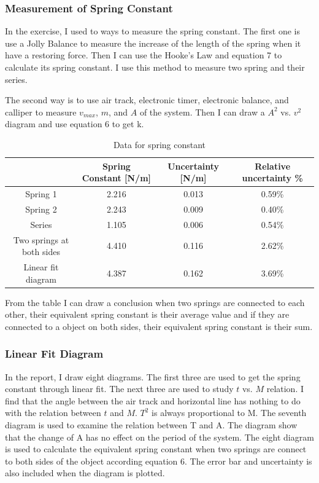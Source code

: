 \documentclass[12pt]{article}
\begin{document}
\subsubsection{Measurement of Spring Constant}
In the exercise, I used to ways to measure the spring constant. The first one is use a Jolly Balance to measure the increase of the length of the spring when it have a restoring force. Then I can use the Hooke's Law and equation 7 to calculate its spring constant. I use this method to measure two spring and their series.
\par The second way is to use air track, electronic timer, electronic balance, and calliper to measure $v_{max}$, $m$, and $A$ of the system. Then I can draw a $A^2$ vs. $v^2$ diagram and use equation 6 to get k.
\begin{table}[H]
\centering
\begin{tabular}{|c|c|c|c|}
\hline
         & Spring Constant [N/m] & Uncertainty [N/m] & Relative uncertainty \% \\ \hline
Spring 1 &    2.216                   &    0.013               &                   0.59\% \\ \hline
Spring 2 &   2.243                    &     0.009              &                        0.40\% \\ \hline
Series   &   1.105                    &      0.006            &              0.54\% \\ \hline
Two springs at both sides        &    4.410                   &       0.116            &              2.62\% \\ \hline
Linear fit diagram&4.387&0.162&3.69\% \\ \hline
\end{tabular}
\caption{Data for spring constant}
\end{table}	
From the table I can draw a conclusion when two springs are connected to each other, their equivalent spring constant is their average value and if they are connected to a object on both sides, their equivalent spring constant is their sum.
\subsubsection{Linear Fit Diagram}
In the report, I draw eight diagrams. The first three are used to get the spring constant through linear fit. The next three are used to study $t$ vs. $M$ relation.
I find that the angle between the air track and horizontal line has nothing to do with the relation between  $t$ and $M$. $T^2$ is always proportional to M.
The seventh diagram is used to examine the relation between T and A. The diagram show that the change of A has no effect on the period of the system.
The eight diagram is used to calculate the equivalent spring constant when two springs are connect to both sides of the object according equation 6.
The error bar and uncertainty is also included when the diagram is plotted.
\end{document}

